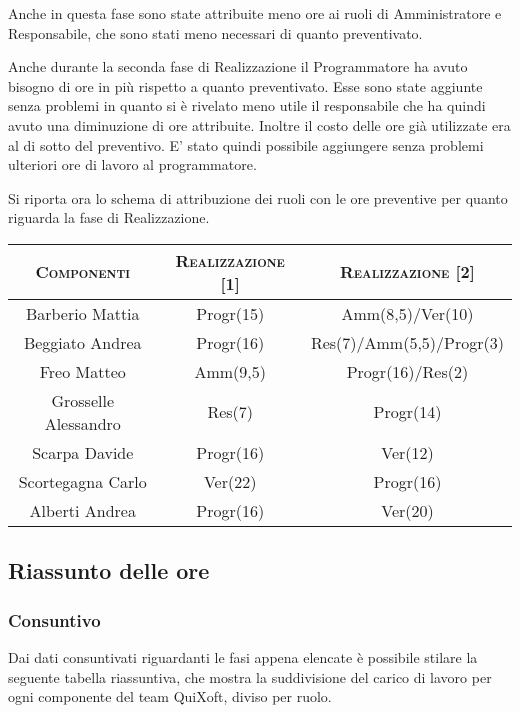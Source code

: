 \documentclass[11pt,a4paper]{article}
\begin{document}
Anche in questa fase sono state attribuite meno ore ai ruoli di Amministratore e Responsabile, che sono stati meno necessari di quanto preventivato.

Anche durante la seconda fase di Realizzazione il Programmatore ha avuto bisogno di ore in più rispetto a quanto preventivato. Esse sono state aggiunte senza problemi in quanto si è rivelato meno utile il responsabile che ha quindi avuto una diminuzione di ore attribuite. Inoltre il costo delle ore già utilizzate era al di sotto del preventivo. E' stato quindi possibile aggiungere senza problemi ulteriori ore di lavoro al programmatore.

Si riporta ora lo schema di attribuzione dei ruoli con le ore preventive per quanto riguarda la fase di Realizzazione.
\\
\begin{center}
\begin{tabular}{|c||c|c|}
\hline
\textsc{Componenti} & \textsc{Realizzazione [1]} & \textsc{Realizzazione [2]} \\ \hline \hline
Barberio Mattia & Progr(15) & Amm(8,5)/Ver(10) \\ \hline
Beggiato Andrea & Progr(16) & Res(7)/Amm(5,5)/Progr(3) \\ \hline
Freo Matteo & Amm(9,5) & Progr(16)/Res(2) \\ \hline
Grosselle Alessandro & Res(7) & Progr(14) \\ \hline
Scarpa Davide & Progr(16) & Ver(12) \\ \hline
Scortegagna Carlo & Ver(22) & Progr(16) \\ \hline
Alberti Andrea & Progr(16) & Ver(20) \\ \hline
\end{tabular}
\end{center}
\bigskip
\subsection{Riassunto delle ore}
\bigskip
\subsubsection{Consuntivo}
Dai dati consuntivati riguardanti le fasi appena elencate è possibile stilare la seguente tabella riassuntiva, che mostra la suddivisione del carico di lavoro per ogni componente del team QuiXoft, diviso per ruolo.
\end{document}
